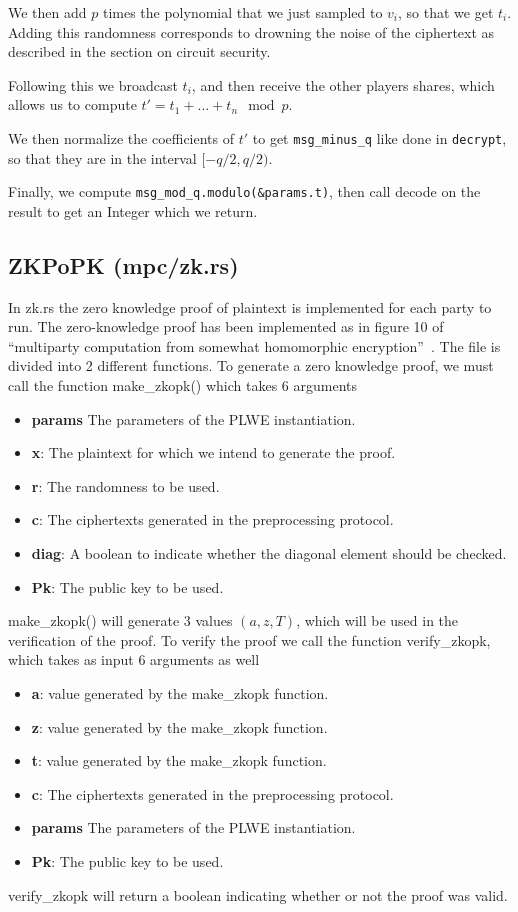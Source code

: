 \documentclass[../main.tex]{subfiles}
\begin{document}
We then add $p$ times the polynomial that we just sampled to $v_i$, so that we get $t_i$. Adding this randomness corresponds to drowning the noise of the ciphertext as described in the section on circuit security.

Following this we broadcast $t_i$, and then receive the other players shares, which allows us to compute $t' = t_1 + ... + t_n \mod p$.

We then normalize the coefficients of $t'$ to get \lstinline{msg_minus_q} like done in \lstinline{decrypt}, so that they are in the interval $[-q/2, q/2)$.

Finally, we compute \lstinline{msg_mod_q.modulo(&params.t)}, then call decode on the result to get an Integer which we return.

\subsection{ZKPoPK (mpc/zk.rs)}

In zk.rs the zero knowledge proof of plaintext is implemented for each party to run.
The zero-knowledge proof has been implemented as in figure 10 of ``multiparty computation from somewhat homomorphic encryption''~\cite{damgaard2012multiparty}.
The file is divided into 2 different functions.
To generate a zero knowledge proof, we must call the function make\_zkopk() which takes 6 arguments
\begin{itemize}
    \item \textbf{params} The parameters of the PLWE instantiation.
    \item \textbf{x}: The plaintext for which we intend to generate the proof.
    \item \textbf{r}: The randomness to be used.
    \item \textbf{c}: The ciphertexts generated in the preprocessing protocol.
    \item \textbf{diag}: A boolean to indicate whether the diagonal element should be checked.
    \item \textbf{Pk}: The public key to be used.
\end{itemize}
make\_zkopk() will generate 3 values $(a, z, T)$, which will be used in the verification of the proof.
To verify the proof we call the function verify\_zkopk, which takes as input 6 arguments as well
\begin{itemize}
    \item \textbf{a}: value generated by the make\_zkopk function.
    \item \textbf{z}: value generated by the make\_zkopk function.
    \item \textbf{t}: value generated by the make\_zkopk function.
    \item \textbf{c}: The ciphertexts generated in the preprocessing protocol.
    \item \textbf{params} The parameters of the PLWE instantiation.
    \item \textbf{Pk}: The public key to be used.
\end{itemize}
verify\_zkopk will return a boolean indicating whether or not the proof was valid.
\end{document}
